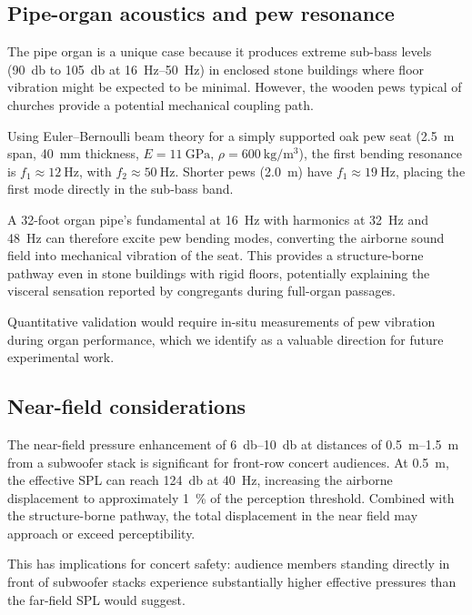 \subsection{Pipe-organ acoustics and pew resonance}
\label{sec:pipe-organ}

The pipe organ is a unique case because it produces extreme sub-bass
levels (\SI{90}{\decibel} to \SI{105}{\decibel} at
\SIrange{16}{50}{\hertz}) in enclosed stone buildings where floor
vibration might be expected to be minimal.  However, the wooden pews
typical of churches provide a potential mechanical coupling path.

Using Euler--Bernoulli beam theory for a simply supported oak pew seat
(\SI{2.5}{\metre} span, \SI{40}{\milli\metre} thickness,
$E = \SI{11}{\giga\pascal}$, $\rho = \SI{600}{\kilogram\per\metre\cubed}$),
the first bending resonance is $f_1 \approx \SI{12}{\hertz}$, with
$f_2 \approx \SI{50}{\hertz}$.  Shorter pews (\SI{2.0}{\metre}) have
$f_1 \approx \SI{19}{\hertz}$, placing the first mode directly in the
sub-bass band.

A 32-foot organ pipe's fundamental at \SI{16}{\hertz} with harmonics at
\SI{32}{\hertz} and \SI{48}{\hertz} can therefore excite pew bending
modes, converting the airborne sound field into mechanical vibration of
the seat.  This provides a structure-borne pathway even in stone
buildings with rigid floors, potentially explaining the visceral
sensation reported by congregants during full-organ passages.

Quantitative validation would require in-situ measurements of pew
vibration during organ performance, which we identify as a valuable
direction for future experimental work.

\subsection{Near-field considerations}
\label{sec:near-field-discussion}

The near-field pressure enhancement of \SIrange{6}{10}{\decibel}
at distances of \SIrange{0.5}{1.5}{\metre} from a subwoofer stack is
significant for front-row concert audiences.  At \SI{0.5}{\metre}, the
effective SPL can reach \SI{124}{\decibel} at \SI{40}{\hertz},
increasing the airborne displacement to approximately \SI{1}{\percent}
of the perception threshold.  Combined with the structure-borne pathway,
the total displacement in the near field may approach or exceed
perceptibility.

This has implications for concert safety: audience members standing
directly in front of subwoofer stacks experience substantially higher
effective pressures than the far-field SPL would suggest.


